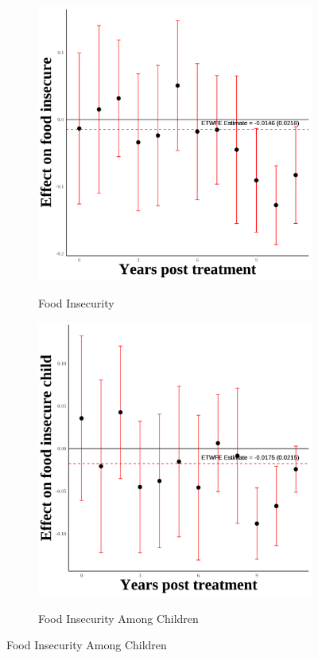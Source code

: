 \documentclass[12pt,english]{article}
\begin{document}
\begin{figure}[H]
  \begin{subfigure}[b]{0.3\textwidth}
    \centering
    \caption{Food Insecurity}
    \includegraphics[width=\linewidth]{figures/plot71-food_insecure_event_study-third-two.png}
    \label{fig:food-insecure-third-two}
  \end{subfigure}
  \hfill
  \begin{subfigure}[b]{0.3\textwidth}
    \centering
    \caption{Food Insecurity Among Children}
    \includegraphics[width=\linewidth]{figures/plot72-food_insecure_child_event_study-third-two.png}
    \label{fig:food-insecure-child-third-two}
  \end{subfigure}

\end{figure}
\end{document}
